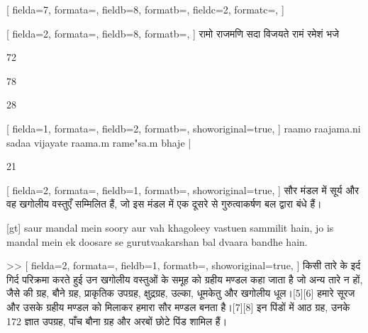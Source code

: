\documentclass{article}
\begin{document}


\begin{multicols}{4}
[
fielda=7,
formata=\small,
fieldb=8,
formatb=\fipa,
fieldc=2,
formatc=\fdevb,
]
\end{multicols}







\newpage
{}[
fielda=2,
formata=\fdevb,
fieldb=8,
formatb=\fipa,
]{
रामो राजमणि सदा विजयते रामं रमेशं भजे
}

72 

78


28




[
fielda=1,
formata=\fipa,
fieldb=2,
formatb=\fdevb,
showoriginal=true,
]{
raamo raajama.ni sadaa vijayate raama.m rame"sa.m bhaje |
}

21

[
fielda=2,
formata=\fdevb,
fieldb=1,
formatb=\fipa,
showoriginal=true,
]{
सौर मंडल में सूर्य और वह खगोलीय वस्तुएँ सम्मिलित हैं, जो इस मंडल में एक दूसरे से गुरुत्वाकर्षण बल द्वारा बंधे हैं।
}

[gt] saur mandal mein soory aur vah khagoleey vastuen sammilit hain, jo is mandal mein ek doosare se gurutvaakarshan bal dvaara bandhe hain.

>> 
[
fielda=2,
formata=\fdevb,
fieldb=1,
formatb=\fipa,
showoriginal=true,
]{ किसी तारे के इर्द गिर्द परिक्रमा करते हुई उन खगोलीय वस्तुओं के समूह को ग्रहीय मण्डल कहा जाता है जो अन्य तारे न हों, जैसे की ग्रह, बौने ग्रह, प्राकृतिक उपग्रह, क्षुद्रग्रह, उल्का, धूमकेतु और खगोलीय धूल।[5][6] हमारे सूरज और उसके ग्रहीय मण्डल को मिलाकर हमारा सौर मण्डल बनता है।[7][8] इन पिंडों में आठ ग्रह, उनके 172 ज्ञात उपग्रह, पाँच बौना ग्रह और अरबों छोटे पिंड शामिल हैं।}
\end{document}
